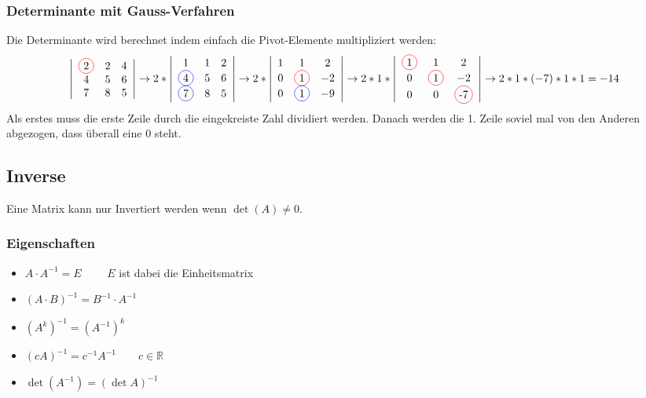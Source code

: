 \subsubsection{Determinante mit Gauss-Verfahren}
Die Determinante wird berechnet indem einfach die Pivot-Elemente multipliziert werden:
\begin{equation*}
	\left|\begin{array}{ccc}
	\circledr{2} & 2 & 4 \\
	4 & 5 & 6 \\
	7 & 8 & 5 \\
	\end{array}\right| 
	\rightarrow %
	2*
	\left|\begin{array}{ccc}	
	1 & 1 & 2 \\
	\circledb{4} & 5 & 6 \\
	\circledb{7} & 8 & 5 \\
	\end{array}\right|
	\rightarrow
	2*
	\left|\begin{array}{ccc}	
	1 & 1 & 2 \\
	0 & \circledr{1} & -2 \\
	0 & \circledb{1} & -9 \\
	\end{array}\right|
	\rightarrow
	2*1*
	\left|\begin{array}{ccc}	
	\circledr{1} & 1 & 2 \\
	0 & \circledr{1} & -2 \\
	0 & 0 & \circledr{-7} \\
	\end{array}\right|
	\rightarrow
	2*1*(-7)*1*1=-14
\end{equation*}
Als erstes muss die erste Zeile durch die eingekreiste Zahl dividiert werden.
Danach werden die 1. Zeile soviel mal von den Anderen abgezogen, dass überall eine 0 steht.

\subsection{Inverse}
Eine Matrix kann nur Invertiert werden wenn $\operatorname{det}(A) \ne 0$.
\subsubsection{Eigenschaften}
\begin{itemize}
	\item $A\cdot A^{-1} = E \qquad$ $E $ ist dabei die Einheitsmatrix
	\item $(A \cdot B)^{-1}=B^{-1} \cdot A^{-1}$
	\item $\left(A^{k}\right)^{-1}=\left(A^{-1}\right)^{k}$
	\item $(c A)^{-1}=c^{-1} A^{-1} \qquad c \in \mathbb{R}$
	\item $\operatorname{det}\left(A^{-1}\right)=(\operatorname{det} A)^{-1}$
\end{itemize}
